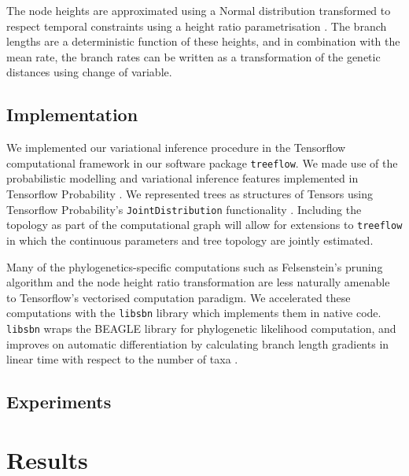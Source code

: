 \documentclass{article}
\begin{document}
The node heights are approximated using a Normal distribution transformed to respect temporal constraints using a height ratio parametrisation \cite{fourment2019evaluating}. The branch lengths are a deterministic function of these heights, and in combination with the mean rate, the branch rates can be written as a transformation of the genetic distances using change of variable.


\subsection*{Implementation}

We implemented our variational inference procedure in the Tensorflow computational framework \cite{abadi2016tensorflow} in our software package \texttt{treeflow}. %
We made use of the probabilistic modelling and variational inference features implemented in Tensorflow Probability \cite{dillon2017tensorflow}. We represented trees as structures of Tensors using Tensorflow Probability's \texttt{JointDistribution} functionality \cite{piponi2020joint}. Including the topology as part of the computational graph will allow for extensions to \texttt{treeflow} in which the continuous parameters and tree topology are jointly estimated.

Many of the phylogenetics-specific computations such as Felsenstein's pruning algorithm and the node height ratio transformation are less naturally amenable to Tensorflow's vectorised computation paradigm. We accelerated these computations with the \texttt{libsbn} library \cite{zhang2018generalizing} which implements them in native code. \texttt{libsbn} wraps the BEAGLE library \cite{ayres2019beagle} for phylogenetic likelihood computation, and improves on automatic differentiation by calculating branch length gradients in linear time with respect to the number of taxa \cite{ji2020gradients}.

\subsection*{Experiments}

\section*{Results}
\end{document}
